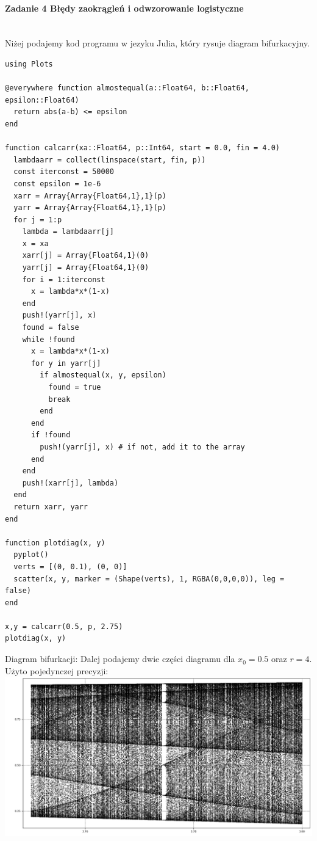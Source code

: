\documentclass[12pt,a4paper]{article}
\begin{document}
  \paragraph{Zadanie 4 Błędy zaokrągleń i odwzorowanie logistyczne}\mbox{}\vspace{3mm}\\
  Niżej podajemy kod programu w jezyku Julia, który rysuje diagram bifurkacyjny.
  \begin{Verbatim}
using Plots

@everywhere function almostequal(a::Float64, b::Float64, epsilon::Float64)
  return abs(a-b) <= epsilon
end

function calcarr(xa::Float64, p::Int64, start = 0.0, fin = 4.0)
  lambdaarr = collect(linspace(start, fin, p))
  const iterconst = 50000
  const epsilon = 1e-6
  xarr = Array{Array{Float64,1},1}(p)
  yarr = Array{Array{Float64,1},1}(p)
  for j = 1:p
    lambda = lambdaarr[j]
    x = xa
    xarr[j] = Array{Float64,1}(0)
    yarr[j] = Array{Float64,1}(0)
    for i = 1:iterconst
      x = lambda*x*(1-x)
    end
    push!(yarr[j], x)
    found = false
    while !found
      x = lambda*x*(1-x)
      for y in yarr[j]
        if almostequal(x, y, epsilon)
          found = true
          break
        end
      end
      if !found
        push!(yarr[j], x) # if not, add it to the array
      end
    end
    push!(xarr[j], lambda)
  end
  return xarr, yarr
end

function plotdiag(x, y)
  pyplot()
  verts = [(0, 0.1), (0, 0)]
  scatter(x, y, marker = (Shape(verts), 1, RGBA(0,0,0,0)), leg = false)
end

x,y = calcarr(0.5, p, 2.75)
plotdiag(x, y)
  \end{Verbatim}
  Diagram bifurkacji: \newline
  Dalej podajemy dwie części diagramu dla $x_0 = 0.5$ oraz $r = 4$. \vspace{3mm}\\
  Użyto pojedynczej precyzji:\newline
  \includegraphics[width=1\textwidth]{img/sp} \newline
\end{document}
